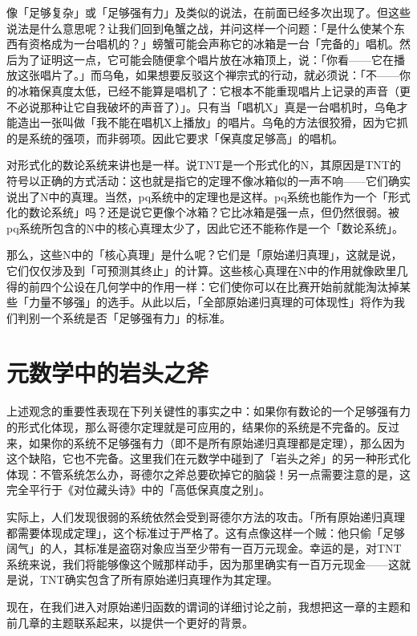 \documentclass[
  12pt,
  twoside,
  openright,
  oldfontcommands,
]{memoir}
\begin{document}
像「足够复杂」或「足够强有力」及类似的说法，在前面已经多次出现了。但这些说法是什么意思呢？让我们回到龟蟹之战，并问这样一个问题：「是什么使某个东西有资格成为一台唱机的？」螃蟹可能会声称它的冰箱是一台「完备的」唱机。然后为了证明这一点，它可能会随便拿个唱片放在冰箱顶上，说：「你看------它在播放这张唱片了。」而乌龟，如果想要反驳这个禅宗式的行动，就必须说：「不------你的冰箱保真度太低，已经不能算是唱机了：它根本不能重现唱片上记录的声音（更不必说那种让它自我破坏的声音了）」。只有当「唱机X」真是一台唱机时，乌龟才能造出一张叫做「我不能在唱机X上播放」的唱片。乌龟的方法很狡猾，因为它抓的是系统的强项，而非弱项。因此它要求「保真度足够高」的唱机。

对形式化的数论系统来讲也是一样。说TNT是一个形式化的N，其原因是TNT的符号以正确的方式活动：这也就是指它的定理不像冰箱似的一声不响------它们确实说出了N中的真理。当然，pq系统中的定理也是这样。pq系统也能作为一个「形式化的数论系统」吗？还是说它更像个冰箱？它比冰箱是强一点，但仍然很弱。被pq系统所包含的N中的核心真理太少了，因此它还不能称作是一个「数论系统」。

那么，这些N中的「核心真理」是什么呢？它们是「原始递归真理」，这就是说，它们仅仅涉及到「可预测其终止」的计算。这些核心真理在N中的作用就像欧里几得的前四个公设在几何学中的作用一样：它们使你可以在比赛开始前就能淘汰掉某些「力量不够强」的选手。从此以后，「全部原始递归真理的可体现性」将作为我们判别一个系统是否「足够强有力」的标准。

\section{元数学中的岩头之斧}

上述观念的重要性表现在下列关键性的事实之中：如果你有数论的一个足够强有力的形式化体现，那么哥德尔定理就是可应用的，结果你的系统是不完备的。反过来，如果你的系统不足够强有力（即不是所有原始递归真理都是定理），那么因为这个缺陷，它也不完备。这里我们在元数学中碰到了「岩头之斧」的另一种形式化体现：不管系统怎么办，哥德尔之斧总要砍掉它的脑袋！另一点需要注意的是，这完全平行于《对位藏头诗》中的「高低保真度之别」。

实际上，人们发现很弱的系统依然会受到哥德尔方法的攻击。「所有原始递归真理都需要体现成定理」，这个标准过于严格了。这有点像这样一个贼：他只偷「足够阔气」的人，其标准是盗窃对象应当至少带有一百万元现金。幸运的是，对TNT系统来说，我们将能够像这个贼那样动手，因为那里确实有一百万元现金------这就是说，TNT确实包含了所有原始递归真理作为其定理。

现在，在我们进入对原始递归函数的谓词的详细讨论之前，我想把这一章的主题和前几章的主题联系起来，以提供一个更好的背景。
\end{document}
